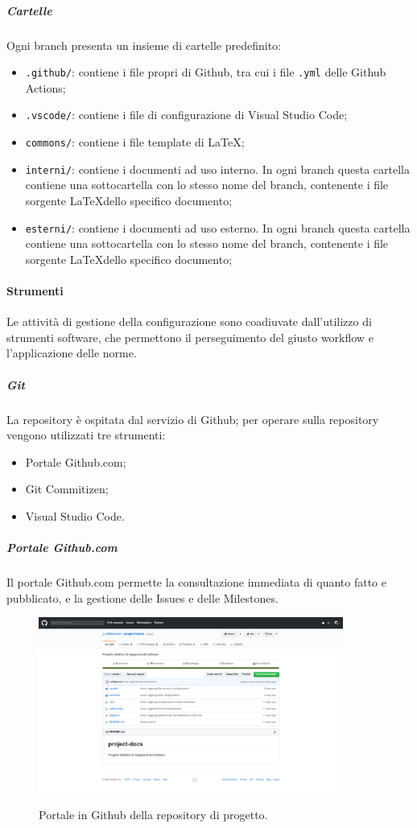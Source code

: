 \documentclass[../norme-di-progetto.tex]{subfiles}
\begin{document}
\subparagraph*{Cartelle}
Ogni branch presenta un insieme di cartelle predefinito:
\begin{itemize}
\item \texttt{.github/}: contiene i file propri di Github, tra cui i file \texttt{.yml} delle Github Actions;
  \item \texttt{.vscode/}: contiene i file di configurazione di Visual Studio Code;
  \item \texttt{commons/}: contiene i file template di \LaTeX;
  \item \texttt{interni/}: contiene i documenti ad uso interno. In ogni branch questa cartella contiene una sottocartella con lo stesso nome del branch, contenente i file sorgente \LaTeX dello specifico documento;
  \item \texttt{esterni/}: contiene i documenti ad uso esterno. In ogni branch questa cartella contiene una sottocartella con lo stesso nome del branch, contenente i file sorgente \LaTeX dello specifico documento;
\end{itemize}

\paragraph{Strumenti}
Le attività di gestione della configurazione sono coadiuvate dall'utilizzo di strumenti software, che permettono il perseguimento del giusto workflow e l'applicazione delle norme.
\subparagraph{Git}
La repository è ospitata dal servizio di  Github; per operare sulla repository vengono utilizzati tre strumenti:
\begin{itemize}
  \item Portale Github.com;
  \item Git Commitizen;
  \item Visual Studio Code.
\end{itemize}
\subparagraph*{Portale Github.com}
Il portale Github.com permette la consultazione immediata di quanto fatto e pubblicato, e la gestione delle Issues e delle Milestones.
\begin{figure}[H]
  \centering
  \includegraphics[width=10cm]{img/github.png}
  \label{fig:github}
  \caption{Portale in Github della repository di progetto.}
\end{figure}
\end{document}
